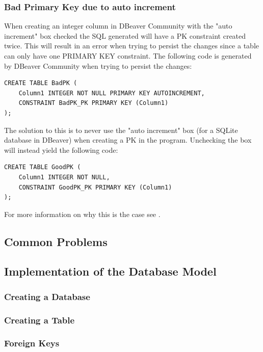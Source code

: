 \documentclass[a4paper,10pt,oneside]{article}
\begin{document}
\subsubsection{Bad Primary Key due to auto increment}
When creating an integer column in DBeaver Community with the "auto increment" box checked the SQL generated will have a PK constraint created twice. This will result in an error when trying to persist the changes since a table can only have one PRIMARY KEY constraint. The following code is generated by DBeaver Community when trying to persist the changes:
\begin{lstlisting}[caption={Bad Primary Key due to auto increment in DBeaver}]
CREATE TABLE BadPK (
	Column1 INTEGER NOT NULL PRIMARY KEY AUTOINCREMENT,
	CONSTRAINT BadPK_PK PRIMARY KEY (Column1)
);
\end{lstlisting}
The solution to this is to never use the "auto increment" box (for a SQLite database in DBeaver) when creating a PK in the program. Unchecking the box will instead yield the following code:
\begin{lstlisting}[caption={Ok Primary Key in DBeaver if auto increment is unchecked}]
CREATE TABLE GoodPK (
	Column1 INTEGER NOT NULL,
	CONSTRAINT GoodPK_PK PRIMARY KEY (Column1)
);
\end{lstlisting}
For more information on why this is the case see \cite{dbeaver_issue_18491}.

\subsection{Common Problems}
\label{dbeaverCommonProblems}

\subsection{Implementation of the Database Model}
\label{dbeaverImplementation}

\subsubsection{Creating a Database}
\label{dbeaverCreatingDatabase}

\subsubsection{Creating a Table}
\label{dbeaverCreatingTable}

\subsubsection{Foreign Keys}
\label{dbeaverForeignKeys}
\end{document}
